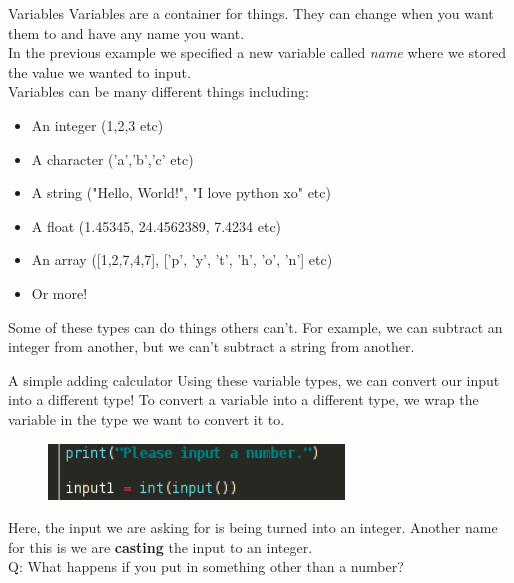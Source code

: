 \documentclass{beamer}
\begin{document}
\begin{frame}{Variables}
Variables are a container for things. They can change when you want them to and have any name you want.\\
\pause
In the previous example we specified a new variable called \textit{name} where we stored the value we wanted to input.\\
\pause
Variables can be many different things including:
\pause
\begin{itemize}
  \item An integer (1,2,3 etc) \pause
  \item A character ('a','b','c' etc) \pause
  \item A string ("Hello, World!", "I love python xo" etc) \pause
  \item A float (1.45345, 24.4562389, 7.4234 etc) \pause
  \item An array ([1,2,7,4,7], ['p', 'y', 't', 'h', 'o', 'n'] etc) \pause
  \item Or more!
\end{itemize}
\pause
Some of these types can do things others can't. For example, we can subtract an integer from another, but we can't subtract a string from another.
\end{frame}

\begin{frame}{A simple adding calculator}
Using these variable types, we can convert our input into a different type! To convert a variable into a different type, we wrap the variable in the type we want to convert it to.
\pause
\begin{figure}[h]
\includegraphics[width=0.7\textwidth]{calc1}
\end{figure}
\pause
Here, the input we are asking for is being turned into an integer. Another name for this is we are \textbf{casting} the input to an integer.\\
Q: What happens if you put in something other than a number?
\end{frame}
\end{document}
